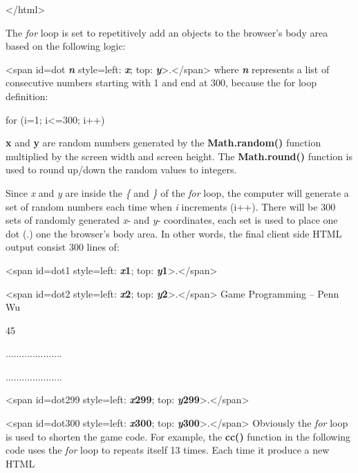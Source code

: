 \documentclass[
]{article}
\begin{document}
\textless/html\textgreater{}

The \emph{for} loop is set to repetitively add an objects to the
browser's body area based on the following logic:

\textless span id=dot \emph{\textbf{n}} \textbf{}
style=\textquotesingle left: \emph{\textbf{x}}; top:
\emph{\textbf{y}}\textquotesingle\textgreater.\textless/span\textgreater{}
where \emph{\textbf{n}} represents a list of consecutive numbers
starting with 1 and end at 300, because the for loop definition:

for (i=1; i\textless=300; i++)

\textbf{x} and \textbf{y} are random numbers generated by the
\textbf{Math.random()} function multiplied by the screen width and
screen height. The \textbf{Math.round()} function is used to round
up/down the random values to integers.

Since \emph{x} and \emph{y} are inside the \emph{\{} and \emph{\}} of
the \emph{for} loop, the computer will generate a set of random numbers
each time when \emph{i} increments (i++). There will be 300 sets of
randomly generated \emph{x}- and \emph{y}- coordinates, each set is used
to place one dot (.) one the browser's body area. In other words, the
final client side HTML output consist 300 lines of:

\textless span id=dot1 style=\textquotesingle left:
\emph{\textbf{x}}\textbf{1}; top:
\emph{\textbf{y}}\textbf{1}\textquotesingle\textgreater.\textless/span\textgreater{}

\textless span id=dot2 style=\textquotesingle left:
\emph{\textbf{x}}\textbf{2}; top:
\emph{\textbf{y}}\textbf{2}\textquotesingle\textgreater.\textless/span\textgreater{}
Game Programming -- Penn Wu

45

\protect\hypertarget{index_split_004.htmlux5cux23p46}{}{}.....................

.....................

\textless span id=dot299 style=\textquotesingle left:
\emph{\textbf{x}}\textbf{299}; top:
\emph{\textbf{y}}\textbf{299}\textquotesingle\textgreater.\textless/span\textgreater{}

\textless span id=dot300 style=\textquotesingle left:
\emph{\textbf{x}}\textbf{300}; top:
\emph{\textbf{y}}\textbf{300}\textquotesingle\textgreater.\textless/span\textgreater{}
Obviously the \emph{for} loop is used to shorten the game code. For
example, the \textbf{cc()} function in the following code uses the
\emph{for} loop to repeats itself 13 times. Each time it produce a new
HTML
\end{document}

